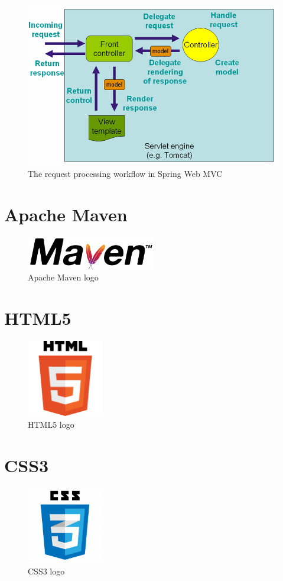 \documentclass[12pt]{article}
\begin{document}
	\begin{figure}[h]
		\centering
		\includegraphics[width=1.0\textwidth]{workflow_spring_mvc.png}
		\caption{The request processing workflow in Spring Web MVC}
	\end{figure}
	
	\section{Apache Maven}
	\begin{figure}[h]
		\centering
		\includegraphics[width=0.5\textwidth]{Maven_logo.png}
		\caption{Apache Maven logo}
	\end{figure}
	\section{HTML5}
	\begin{figure}[h]
		\centering
		\includegraphics[width=0.3\textwidth]{HTML5_logo.png}
		\caption{HTML5 logo}
	\end{figure}
	\section{CSS3}
	\begin{figure}[h]
		\centering
		\includegraphics[width=0.3\textwidth]{CSS3_logo.png}
		\caption{CSS3 logo}
	\end{figure}
\end{document}
